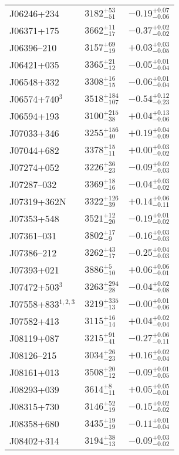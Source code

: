 \documentclass{aa}
\begin{document}
\begin{appendix}
\begin{center}
\begin{xtabular}{lll}
J06246+234 & $3182_{-51}^{+53}$ & $-0.19_{-0.06}^{+0.07}$ \\
J06371+175 & $3662_{-17}^{+11}$ & $-0.37_{-0.02}^{+0.02}$ \\
J06396--210 & $3157_{-19}^{+69}$ & $+0.03_{-0.05}^{+0.03}$ \\
J06421+035 & $3365_{-12}^{+21}$ & $-0.05_{-0.04}^{+0.01}$ \\
J06548+332 & $3308_{-15}^{+16}$ & $-0.06_{-0.04}^{+0.01}$ \\
J06574+740$^{3}$ & $3518_{-107}^{+184}$ & $-0.54_{-0.23}^{+0.12}$ \\
J06594+193 & $3100_{-38}^{+215}$ & $+0.04_{-0.06}^{+0.13}$ \\
J07033+346 & $3255_{-40}^{+156}$ & $+0.19_{-0.09}^{+0.04}$ \\
J07044+682 & $3378_{-11}^{+15}$ & $+0.00_{-0.02}^{+0.03}$ \\
J07274+052 & $3226_{-23}^{+36}$ & $-0.09_{-0.03}^{+0.02}$ \\
J07287--032 & $3369_{-16}^{+18}$ & $-0.04_{-0.02}^{+0.03}$ \\
J07319+362N & $3322_{-39}^{+126}$ & $+0.14_{-0.11}^{+0.06}$ \\
J07353+548 & $3521_{-20}^{+12}$ & $-0.19_{-0.02}^{+0.01}$ \\
J07361--031 & $3802_{-9}^{+17}$ & $-0.16_{-0.03}^{+0.03}$ \\
J07386--212 & $3262_{-17}^{+43}$ & $-0.25_{-0.03}^{+0.04}$ \\
J07393+021 & $3886_{-10}^{+5}$ & $+0.06_{-0.01}^{+0.06}$ \\
J07472+503$^{3}$ & $3263_{-28}^{+294}$ & $-0.04_{-0.08}^{+0.02}$ \\
J07558+833$^{1,2,3}$ & $3219_{-13}^{+335}$ & $-0.00_{-0.06}^{+0.01}$ \\
J07582+413 & $3115_{-14}^{+16}$ & $+0.04_{-0.04}^{+0.02}$ \\
J08119+087 & $3215_{-41}^{+91}$ & $-0.27_{-0.11}^{+0.06}$ \\
J08126--215 & $3034_{-23}^{+26}$ & $+0.16_{-0.04}^{+0.02}$ \\
J08161+013 & $3508_{-12}^{+20}$ & $-0.09_{-0.05}^{+0.01}$ \\
J08293+039 & $3614_{-11}^{+8}$ & $+0.05_{-0.01}^{+0.05}$ \\
J08315+730 & $3146_{-19}^{+52}$ & $-0.15_{-0.02}^{+0.02}$ \\
J08358+680 & $3435_{-19}^{+19}$ & $-0.11_{-0.04}^{+0.01}$ \\
J08402+314 & $3194_{-13}^{+38}$ & $-0.09_{-0.02}^{+0.03}$ \\

\end{xtabular}
\end{center}
\end{appendix}
\end{document}
